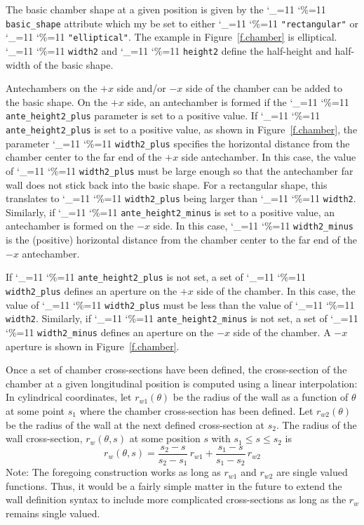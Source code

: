 \documentclass[11pt]{article}
\newcommand\ttcmd{\begingroup\catcode`\_=11 \catcode`\%=11 \dottcmd}
\newcommand\dottcmd[1]{\texttt{#1}\endgroup}
\newcommand{\Begineq}{\begin{equation}}
\newcommand{\Endeq}{\end{equation}}
\newcommand{\fig}[1]{Figure~\ref{#1}}
\newcommand{\vn}{\ttcmd}
\begin{document}
The basic chamber shape at a given position is given by the
\vn{basic_shape} attribute which my be set to either
\vn{"rectangular"} or \vn{"elliptical"}. The example in
\fig{f.chamber} is elliptical. \vn{width2} and \vn{height2} define the
half-height and half-width of the basic shape. 

Antechambers on the $+x$ side and/or $-x$ side of the chamber can be
added to the basic shape. On the $+x$ side, an antechamber is formed
if the \vn{ante_height2_plus} parameter is set to a positive value. If
\vn{ante_height2_plus} is set to a positive value, as shown in
\fig{f.chamber}, the parameter \vn{width2_plus} specifies the
horizontal distance from the chamber center to the far end of the $+x$
side antechamber. In this case, the value of \vn{width2_plus} must be
large enough so that the antechamber far wall does not stick back into
the basic shape. For a rectangular shape, this translates to
\vn{width2_plus} being larger than \vn{width2}. Similarly, if
\vn{ante_height2_minus} is set to a positive value, an antechamber is
formed on the $-x$ side.  In this case, \vn{width2_minus} is the
(positive) horizontal distance from the chamber center to the far end
of the $-x$ antechamber.

If \vn{ante_height2_plus} is not set, a set of \vn{width2_plus}
defines an aperture on the $+x$ side of the chamber. In this case, the
value of \vn{width2_plus} must be less than the value of
\vn{width2}. Similarly, if \vn{ante_height2_minus} is not set, a set of
\vn{width2_minus} defines an aperture on the $-x$ side of the chamber.
A $-x$ aperture is shown in \fig{f.chamber}.

Once a set of chamber cross-sections have been defined, the
cross-section of the chamber at a given longitudinal position is
computed using a linear interpolation: In cylindrical coordinates,
let $r_{w1}(\theta)$ be the radius of the wall as a function of
$\theta$ at some point $s_1$ where the chamber cross-section has been
defined. Let $r_{w2}(\theta)$ be the radius of the wall at the next
defined cross-section at $s_2$. The radius of the wall cross-section,
$r_w(\theta, s)$ at some position $s$ with $s_1 \le s \le s_2$ is
\Begineq
  r_w(\theta, s) = \frac{s_2 - s}{s_2 - s_1} \, r_{w1} + \frac{s_1 - s}{s_1 - s_2} \, r_{w2}
\Endeq
Note: The foregoing construction works as long as $r_{w1}$ and
$r_{w2}$ are single valued functions. Thus, it would be a fairly
simple matter in the future to extend the wall definition syntax to include more
complicated cross-sections as long as the $r_w$ remains single valued.
\end{document}
